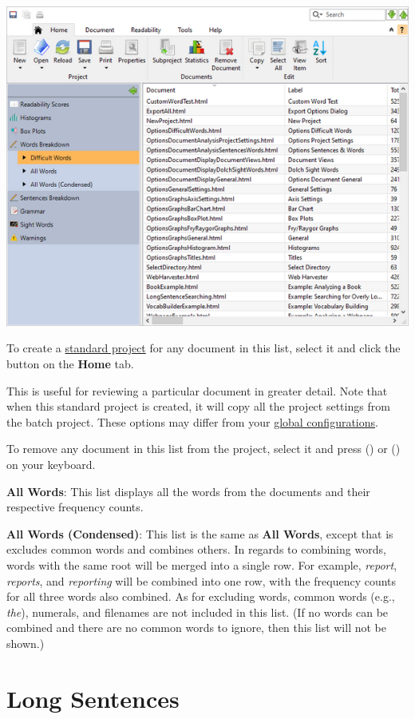 \documentclass[
]{book}
\theoremstyle{definition}
\theoremstyle{definition}
\theoremstyle{definition}
\theoremstyle{definition}
\theoremstyle{remark}
\begin{document}
\includegraphics{Images/batchdifficultwordsverbose.png}

To create a \protect\hyperlink{creating-standard-project}{standard project} for any document in this list, select it and click the  button on the \textbf{Home} tab.

This is useful for reviewing a particular document in greater detail. Note that when this standard project is created, it will copy all the project settings from the batch project. These options may differ from your \protect\hyperlink{options-overview}{global configurations}.

To remove any document in this list from the project, select it and press  (\faWindows) or \keys{\backdel} (\faApple) on your keyboard.

\textbf{All Words}: This list displays all the words from the documents and their respective frequency counts.

\textbf{All Words (Condensed)}: This list is the same as \textbf{All Words}, except that is excludes common words and combines others. In regards to combining words, words with the same root will be merged into a single row. For example, \emph{report}, \emph{reports}, and \emph{reporting} will be combined into one row, with the frequency counts for all three words also combined. As for excluding words, common words (e.g., \emph{the}), numerals, and filenames are not included in this list. (If no words can be combined and there are no common words to ignore, then this list will not be shown.)

\hypertarget{reviewing-batch-long-sentences}{%
\section{Long Sentences}\label{reviewing-batch-long-sentences}}
\end{document}
